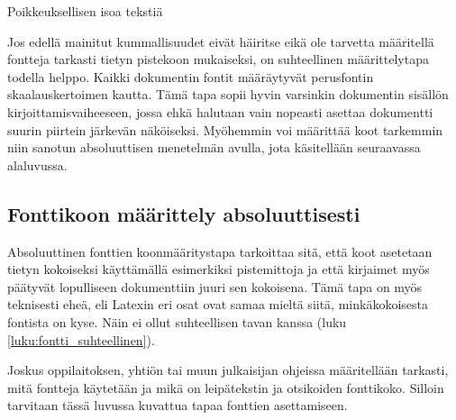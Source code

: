 \begin{koodilohkosis}
  { Poikkeuksellisen isoa tekstiä}
\end{koodilohkosis}

Jos edellä mainitut kummallisuudet eivät häiritse eikä ole tarvetta
määritellä fontteja tarkasti tietyn pistekoon mukaiseksi, on
suhteellinen määrittelytapa todella helppo. Kaikki dokumentin fontit
määräytyvät perusfontin skaalauskertoimen kautta. Tämä tapa sopii hyvin
varsinkin dokumentin sisällön kirjoittamisvaiheeseen, jossa ehkä
halutaan vain nopeasti asettaa dokumentti suurin piirtein järkevän
näköiseksi. Myöhemmin voi määrittää koot tarkemmin niin sanotun
absoluuttisen menetelmän avulla, jota käsitellään seuraavassa
alaluvussa.

\subsection{Fonttikoon määrittely absoluuttisesti}
\label{luku:fontti_absoluuttinen}

Absoluuttinen fonttien koonmääritystapa tarkoittaa sitä, että koot
asetetaan tietyn kokoiseksi käyttämällä esimerkiksi pistemittoja ja että
kirjaimet myös päätyvät lopulliseen dokumenttiin juuri sen kokoisena.
Tämä tapa on myös teknisesti eheä, eli Latexin eri osat ovat samaa
mieltä siitä, minkäkokoisesta fontista on kyse. Näin ei ollut
suhteellisen tavan kanssa (luku \ref{luku:fontti_suhteellinen}).

Joskus oppilaitoksen, yhtiön tai muun julkaisijan ohjeissa määritellään
tarkasti, mitä fontteja käytetään ja mikä on leipätekstin ja otsikoiden
fonttikoko. Silloin tarvitaan tässä luvussa kuvattua tapaa fonttien
asettamiseen.

